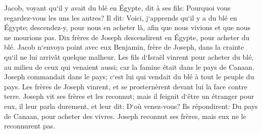 \verse Jacob, voyant qu`il y avait du blé en Égypte, dit à ses fils: Pourquoi vous regardez-vous les uns les autres? 
\verse Il dit: Voici, j`apprends qu`il y a du blé en Égypte; descendez-y, pour nous en acheter là, afin que nous vivions et que nous ne mourions pas. 
\verse Dix frères de Joseph descendirent en Égypte, pour acheter du blé. 
\verse Jacob n`envoya point avec eux Benjamin, frère de Joseph, dans la crainte qu`il ne lui arrivât quelque malheur. 
\verse Les fils d`Israël vinrent pour acheter du blé, au milieu de ceux qui venaient aussi; car la famine était dans le pays de Canaan. 
\verse Joseph commandait dans le pays; c`est lui qui vendait du blé à tout le peuple du pays. Les frères de Joseph vinrent, et se prosternèrent devant lui la face contre terre. 
\verse Joseph vit ses frères et les reconnut; mais il feignit d`être un étranger pour eux, il leur parla durement, et leur dit: D`où venez-vous? Ils répondirent: Du pays de Canaan, pour acheter des vivres. 
\verse Joseph reconnut ses frères, mais eux ne le reconnurent pas. 
